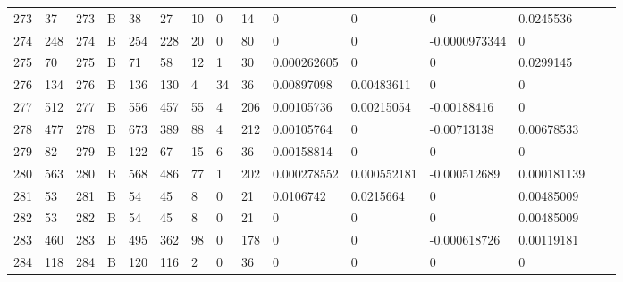 \begin{longtable}{lllllllllllllll}
	273 & 37                & 273 & B   & 38                & 27                & 10                & 0    & 14         & 0              & 0              & 0             & 0.0245536    \\
	274 & 248               & 274 & B   & 254               & 228               & 20                & 0    & 80         & 0              & 0              & -0.0000973344 & 0            \\
	275 & 70                & 275 & B   & 71                & 58                & 12                & 1    & 30         & 0.000262605    & 0              & 0             & 0.0299145    \\
	276 & 134               & 276 & B   & 136               & 130               & 4                 & 34   & 36         & 0.00897098     & 0.00483611     & 0             & 0            \\
	277 & 512               & 277 & B   & 556               & 457               & 55                & 4    & 206        & 0.00105736     & 0.00215054     & -0.00188416   & 0            \\
	278 & 477               & 278 & B   & 673               & 389               & 88                & 4    & 212        & 0.00105764     & 0              & -0.00713138   & 0.00678533   \\
	279 & 82                & 279 & B   & 122               & 67                & 15                & 6    & 36         & 0.00158814     & 0              & 0             & 0            \\
	280 & 563               & 280 & B   & 568               & 486               & 77                & 1    & 202        & 0.000278552    & 0.000552181    & -0.000512689  & 0.000181139  \\
	281 & 53                & 281 & B   & 54                & 45                & 8                 & 0    & 21         & 0.0106742      & 0.0215664      & 0             & 0.00485009   \\
	282 & 53                & 282 & B   & 54                & 45                & 8                 & 0    & 21         & 0              & 0              & 0             & 0.00485009   \\
	283 & 460               & 283 & B   & 495               & 362               & 98                & 0    & 178        & 0              & 0              & -0.000618726  & 0.00119181   \\
	284 & 118               & 284 & B   & 120               & 116               & 2                 & 0    & 36         & 0              & 0              & 0             & 0            \\

\end{longtable}
